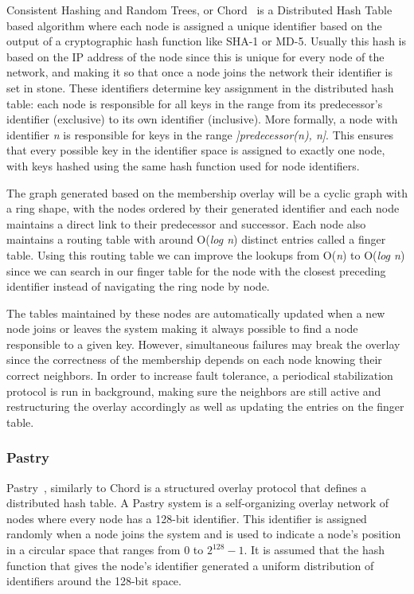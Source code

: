 Consistent Hashing and Random Trees, or Chord~\cite{chord} is a Distributed Hash
Table based algorithm where each node is assigned a unique identifier based on
the output of a cryptographic hash function like SHA-1 or MD-5. Usually this hash is based on the IP address of
the node since this is unique for every node of the network, and making it so
that once a node joins the network their identifier is set in stone. These
identifiers determine key assignment in the distributed hash table: each node is responsible
for all keys in the range from its predecessor's identifier (exclusive) to its own identifier (inclusive).
More formally, a node with identifier \textit{n} is responsible for keys in the range \textit{]predecessor(n), n]}.
This ensures that every possible key in the identifier space is assigned to exactly one node,
with keys hashed using the same hash function used for node identifiers.

The graph generated based on the membership overlay will be a cyclic graph with
a ring shape, with the nodes ordered by their generated identifier and each node maintains a direct link
to their predecessor and successor. Each node
also maintains a routing table with around O(\textit{log n}) distinct entries
called a finger table. Using this routing table we can improve the lookups from O(\textit{n}) to O(\textit{log n})
since we can search in our finger table for the node with the closest preceding identifier instead of
navigating the ring node by node.

The tables maintained by these nodes are automatically updated when a new node joins
or leaves the system  making it always possible to find a node responsible to a given
key. However, simultaneous failures may break the overlay since the correctness
of the membership depends on each node knowing their correct neighbors. In order
to increase fault tolerance, a periodical stabilization protocol is run in background,
making sure the neighbors are still active and restructuring the overlay
accordingly as well as updating the entries on the finger table.

\subsubsection{Pastry}\label{subsec:pastry}

Pastry~\cite{pastry}, similarly to Chord is a structured overlay protocol that
defines a distributed hash table. A Pastry system is a self-organizing overlay
network of nodes where every node has a 128-bit identifier. This identifier
is assigned randomly when a node joins the system and is used to indicate a
node's position in a circular space that ranges from 0 to $2^{128}-1$. It is assumed
that the hash function that gives the node's identifier generated a uniform
distribution of identifiers around the 128-bit space.

